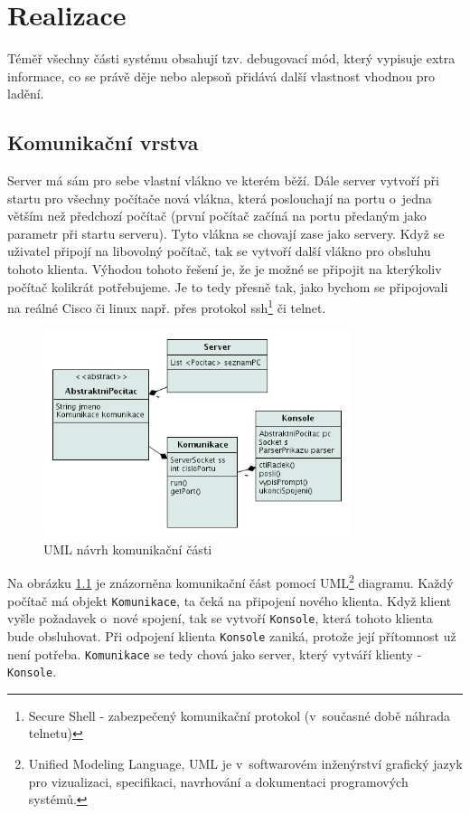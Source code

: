 \chapter{Realizace} \label{realizace}

Téměř všechny části systému obsahují tzv. debugovací mód, který vypisuje extra informace, co se právě děje nebo alepsoň přidává další vlastnost vhodnou pro ladění.

\section{Komunikační vrstva}
Server má sám pro sebe vlastní vlákno ve kterém běží. Dále server vytvoří při startu pro všechny počítače nová vlákna, která poslouchají na portu o~jedna větším než předchozí počítač (první počítač začíná na portu předaným jako parametr při startu serveru). Tyto vlákna se chovají zase jako servery. Když se uživatel připojí na libovolný počítač, tak se vytvoří další vlákno pro obsluhu tohoto klienta. Výhodou tohoto řešení je, že je možné se připojit na kterýkoliv počítač kolikrát potřebujeme. Je to tedy přesně tak, jako bychom se připojovali na reálné Cisco či linux např. přes protokol ssh\footnote{Secure Shell - zabezpečený komunikační protokol (v~současné době náhrada telnetu)} či telnet.

\begin{figure}[h]
\begin{center}
\includegraphics[width=9cm]{figures/uml_sit}
\caption{UML návrh komunikační části}
\label{uml:sit}
\end{center}
\end{figure}

Na obrázku \ref{uml:sit} je znázorněna komunikační část pomocí UML\footnote{Unified Modeling Language, UML je v~softwarovém inženýrství grafický jazyk pro vizualizaci, specifikaci, navrhování a dokumentaci programových systémů.\cite{wiki:uml}} diagramu. Každý počítač má objekt \verb|Komunikace|, ta čeká na připojení nového klienta. Když klient vyšle požadavek o~nové spojení, tak se vytvoří \verb|Konsole|, která tohoto klienta bude obsluhovat. Při odpojení klienta \verb|Konsole| zaniká, protože její přítomnost už není potřeba. \verb|Komunikace| se tedy chová jako server, který vytváří klienty - \verb|Konsole|.

